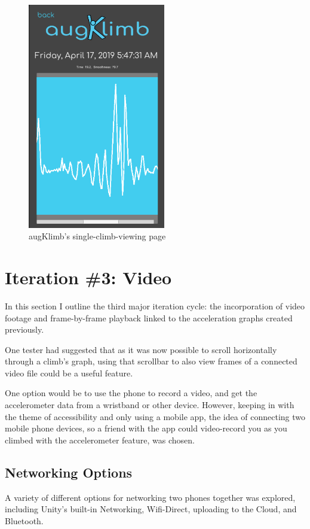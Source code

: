 \begin{figure}[h]
\centering
\includegraphics[width=6cm]{imgs/singleclimb}
\caption{augKlimb's single-climb-viewing page}
\label{fig:singleclimb}
\end{figure}




\section{Iteration \#3: Video}
In this section I outline the third major iteration cycle: the incorporation of video footage and frame-by-frame playback linked to the acceleration graphs created previously.


One tester had suggested that as it was now possible to scroll horizontally through a climb's graph, using that scrollbar to also view frames of a connected video file could be a useful feature.

One option would be to use the phone to record a video, and get the accelerometer data from a wristband or other device.
However, keeping in with the theme of accessibility and only using a mobile app, the idea of connecting two mobile phone devices, so a friend with the app could video-record you as you climbed with the accelerometer feature, was chosen.


\subsection{Networking Options}
A variety of different options for networking two phones together was explored, including Unity's built-in Networking, Wifi-Direct, uploading to the Cloud, and Bluetooth.



